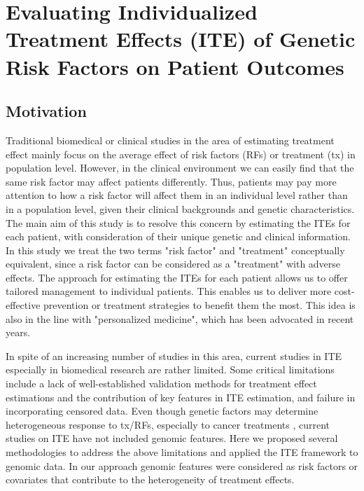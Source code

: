 \chapter{Evaluating Individualized Treatment Effects (ITE) of Genetic Risk Factors on Patient Outcomes}
\label{chap:ite}

\section{Motivation}
\label{sec:ite_mot}
  Traditional biomedical or clinical studies in the area of estimating treatment effect mainly focus on the average effect of risk factors (RFs) or treatment (tx) in population level. However, in the clinical environment we can easily find that the same risk factor may affect patients differently. Thus, patients may pay more attention to how a risk factor will affect them in an individual level rather than in a population level, given their clinical backgrounds and genetic characteristics. The main aim of this study is to resolve this concern by estimating the ITEs for each patient, with consideration of their unique genetic and clinical information. In this study we treat the two terms "risk factor" and "treatment" conceptually equivalent, since a risk factor can be considered as a "treatment" with adverse effects. The approach for estimating the ITEs for each patient allows us to offer tailored management to individual patients. This enables us to deliver more cost-effective prevention or treatment strategies to benefit them the most. This idea is also in the line with "personalized medicine", which has been advocated in recent years.

  In spite of an increasing number of studies in this area, current studies in ITE especially in biomedical research are rather limited. Some critical limitations include a lack of well-established validation methods for treatment effect estimations and the contribution of key features in ITE estimation, and failure in incorporating censored data. Even though genetic factors may determine heterogeneous response to tx/RFs, especially to cancer treatments \cite{fisher2013cancer}, current studies on ITE have not included genomic features. Here we proposed several methodologies to address the above limitations and applied the ITE framework to genomic data. In our approach genomic features were considered as risk factors or covariates that contribute to the heterogeneity of treatment effects.

